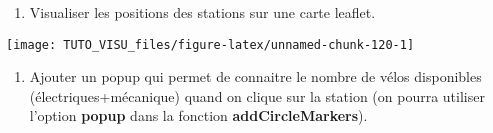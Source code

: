 \documentclass[]{book}
\newenvironment{Shaded}{\begin{snugshade}}{\end{snugshade}}
\newcommand{\DataTypeTok}[1]{\textcolor[rgb]{0.13,0.29,0.53}{#1}}
\newcommand{\DecValTok}[1]{\textcolor[rgb]{0.00,0.00,0.81}{#1}}
\newcommand{\ErrorTok}[1]{\textcolor[rgb]{0.64,0.00,0.00}{\textbf{#1}}}
\newcommand{\FloatTok}[1]{\textcolor[rgb]{0.00,0.00,0.81}{#1}}
\newcommand{\KeywordTok}[1]{\textcolor[rgb]{0.13,0.29,0.53}{\textbf{#1}}}
\newcommand{\NormalTok}[1]{#1}
\newcommand{\OperatorTok}[1]{\textcolor[rgb]{0.81,0.36,0.00}{\textbf{#1}}}
\newcommand{\OtherTok}[1]{\textcolor[rgb]{0.56,0.35,0.01}{#1}}
\newcommand{\StringTok}[1]{\textcolor[rgb]{0.31,0.60,0.02}{#1}}
\providecommand{\tightlist}{%
  \setlength{\itemsep}{0pt}\setlength{\parskip}{0pt}}
\theoremstyle{definition}
\theoremstyle{definition}
\theoremstyle{definition}
\theoremstyle{remark}
\begin{document}
\begin{Shaded}
\end{Shaded}

\begin{enumerate}
\def\labelenumi{\arabic{enumi}.}
\setcounter{enumi}{3}
\tightlist
\item
  Visualiser les positions des stations sur une carte leaflet.
\end{enumerate}

\begin{Shaded}
\end{Shaded}

\begin{center}\texttt{[image: TUTO\_VISU\_files/figure-latex/unnamed-chunk-120-1]} \end{center}

\begin{enumerate}
\def\labelenumi{\arabic{enumi}.}
\setcounter{enumi}{4}
\tightlist
\item
  Ajouter un popup qui permet de connaitre le nombre de vélos disponibles (électriques+mécanique) quand on clique sur la station (on pourra utiliser l'option \textbf{popup} dans la fonction \textbf{addCircleMarkers}).
\end{enumerate}
\end{document}
